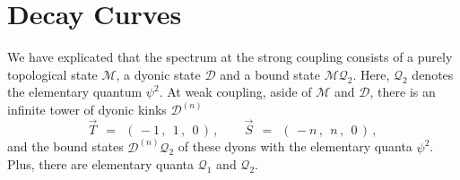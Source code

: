 \documentclass[epsfig,12pt]{article}
\def\beq{\begin{equation}}
\def\eeq{\end{equation}}
\def\beq{\begin{equation}}
\def\eeq{\end{equation}}
\newcommand{\mc}[1]{\mathcal{#1}}
\begin{document}


\newpage
\section{Decay Curves}
\setcounter{equation}{0}

	We have explicated that the spectrum at the strong coupling consists of a purely topological state $ \mc{M} $,
	a dyonic state $ \mc{D} $ and a bound state $ \mc{M} \mc{Q}_2 $.
	Here, $ \mc{Q}_2 $ denotes the elementary quantum $ \psi^2 $.
	At weak coupling, aside of $ \mc{M} $ and $ \mc{D} $, there is an infinite tower of dyonic kinks $ \mc{D}^{(n)} $
\beq
	\vec{T} ~~=~~ (\, -1\,,~~ 1\,,~~ 0 \,)\,, \qquad
	\vec{S} ~~=~~ (\, -n\,,~~ n\,,~~ 0 \,)\,, 
\eeq
	and the bound states $ \mc{D}^{(n)} \mc{Q}_2 $  of these dyons with the elementary quanta $ \psi^2 $.
	Plus, there are elementary quanta $ \mc{Q}_1 $ and $ \mc{Q}_2 $.
\end{document}
